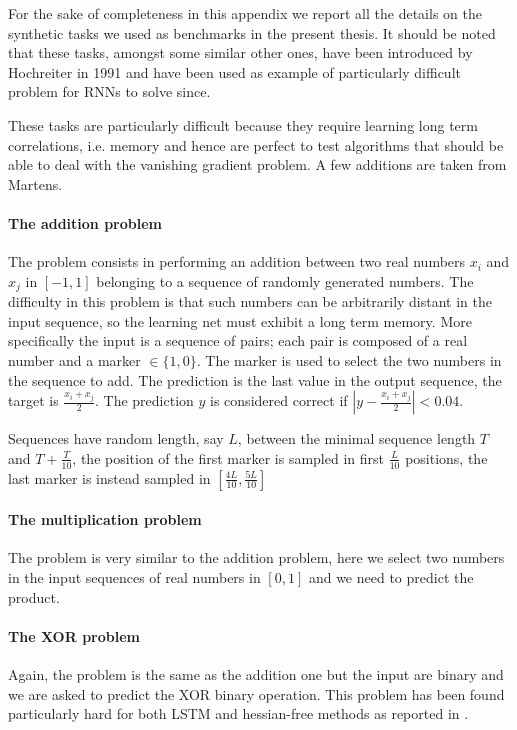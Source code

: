 For the sake of completeness in this appendix we report all the details on the synthetic tasks we used as benchmarks in the present thesis. It should be noted that these tasks, amongst some similar other ones, have been introduced by Hochreiter \cite{lstm} in 1991 and have been used as example of particularly difficult problem for RNNs to solve since. 

These tasks are particularly difficult because they require learning long term correlations, i.e. memory and hence are perfect to test algorithms that should be able to deal with the vanishing gradient problem. A few additions are taken from Martens\cite{hessianFree}.

\paragraph{The addition problem}
The problem consists in performing an addition between two real numbers $x_i$ and $x_j$ in $[-1,1]$ belonging to a sequence of randomly generated numbers. The difficulty in this problem is that such numbers can be arbitrarily
distant in the input sequence, so the learning net must exhibit a long term memory. More specifically the input is a sequence of pairs; each pair is composed of a real number and a marker $\in\{1,0\}$. The marker is used to select the two numbers in the sequence to add. The prediction is the last value in the output sequence, the target is $\frac{x_i+x_j}{2}$. The prediction $y$ is considered correct
if $|y-\frac{x_i+x_j}{2}| < 0.04$.

Sequences have random length, say $L$, between the minimal sequence length $T$ and $T+\frac{T}{10}$, the position of the first marker is sampled in first $\frac{L}{10}$ positions, the last marker is
instead sampled in $[\frac{4L}{10},\frac{5L}{10}]$

\paragraph{The multiplication problem}
The problem is very similar to the addition problem, here we select two numbers in the input sequences of real numbers in $[0,1]$ and we need to predict the product.

\paragraph{The XOR problem}
Again, the problem is the same as the addition one but the input are binary and we are asked to predict the XOR binary operation. This problem has been found particularly hard for both LSTM and hessian-free methods as reported in \cite{hessianFree}.

